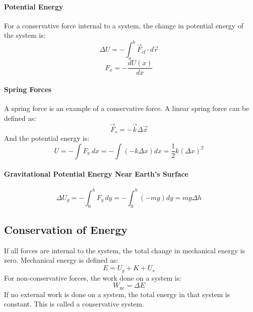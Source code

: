 \documentclass{article}
\begin{document}
            \paragraph{Potential Energy}
            For a conservative force internal to a system, the change in potential energy of the system is:
            \begin{equation}
                \Delta U = - \int_a^b \vec{F}_\text{cf} \cdot d\vec{r}
            \end{equation}
            \begin{equation}
                F_x = - \frac{dU(x)}{dx}
            \end{equation}

            \paragraph{Spring Forces}
            A spring force is an example of a conservative force. A linear spring force can be defined as:
            \begin{equation}
                \vec{F}_s = - \vec{k} \Delta \vec{x}
            \end{equation}
            And the potential energy is:
            \begin{equation}
                U = - \int F_x \, dx = - \int \left( - k \Delta x \right) dx = \frac{1}{2} k \left( \Delta x \right)^2
            \end{equation}

            \paragraph{Gravitational Potential Energy Near Earth's Surface}
            \begin{equation}
                \Delta U_g = - \int_0^h F_y \, dy = - \int_0^h \left( - m g \right) dy = m g \Delta h
            \end{equation}

        \subsection{Conservation of Energy}
            If all forces are internal to the system, the total change in mechanical energy is zero. Mechanical energy is defined as:
            \begin{equation}
                E = U_g + K + U_s
            \end{equation}
            For non-conservative forces, the work done on a system is:
            \begin{equation}
                W_\text{nc} = \Delta E
            \end{equation}
            If no external work is done on a system, the total energy in that system is constant. This is called a conservative system.
\end{document}
